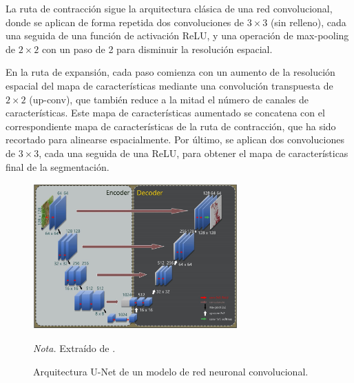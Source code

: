 La ruta de contracción sigue la arquitectura clásica de una red convolucional, donde se aplican de forma repetida dos convoluciones de $3 \times 3$ (sin relleno), 
cada una seguida de una función de activación ReLU, y una operación de max-pooling de $2 \times 2$ con un paso de 2 para disminuir la resolución espacial. 

En la ruta de expansión, cada paso comienza con un aumento de la resolución espacial del mapa de características mediante una convolución transpuesta de $2 \times 2$ 
(up-conv), que también reduce a la mitad el número de canales de características. Este mapa de características aumentado se concatena con el correspondiente mapa de 
características de la ruta de contracción, que ha sido recortado para alinearse espacialmente. Por último, se aplican dos convoluciones de $3 \times 3$, cada una seguida 
de una ReLU, para obtener el mapa de características final de la segmentación.

\begin{figure}[H]
    \centering
    \caption{Arquitectura U-Net de un modelo de red neuronal convolucional.}
    \includegraphics[width=0.7\textwidth]{img/4_marco_teorico/u_net.png}
    \label{fig:u-net}
    \begin{flushleft}
        \textit{Nota.} Extraído de \citet{al_dabbagh_2023}. 
        \vspace{-\baselineskip}       
    \end{flushleft}  
\end{figure}

